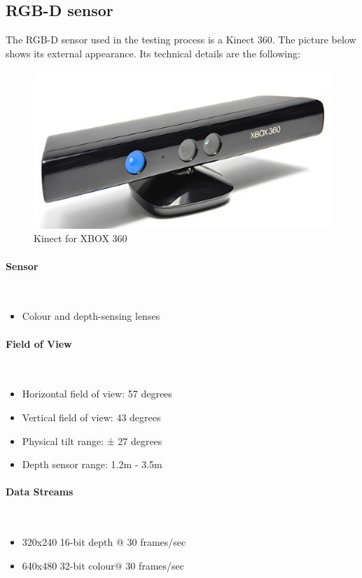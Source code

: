 \subsection{RGB-D sensor}
	The RGB-D sensor used in the testing process is a Kinect 360. 
	The picture below shows its external appearance. 
	Its technical details are the following: 
	\begin{figure}[H]
		\begin{center}
	\includegraphics[scale=0.3]{img/kinect.eps}
		\caption[Kinect image]{Kinect for XBOX 360}
		\end{center}
	\end{figure}
	\paragraph{ Sensor} \mbox{} \\
		\begin{itemize}
			\item Colour and depth-sensing lenses
		\end{itemize}
		\vspace*{0.5cm}

	\paragraph{ Field of View} \mbox{} \\
		\begin{itemize}

			\item Horizontal field of view: 57 degrees
			\item Vertical field of view: 43 degrees
			\item Physical tilt range: ± 27 degrees
			\item Depth sensor range: 1.2m - 3.5m
		\end{itemize}
		\vspace*{0.5cm}

	\paragraph{ Data Streams} \mbox{} \\
		\begin{itemize}

			\item 320x240 16-bit depth @ 30 frames/sec
			\item 640x480 32-bit colour@ 30 frames/sec
		\end{itemize}
		\vspace*{0.5cm}
